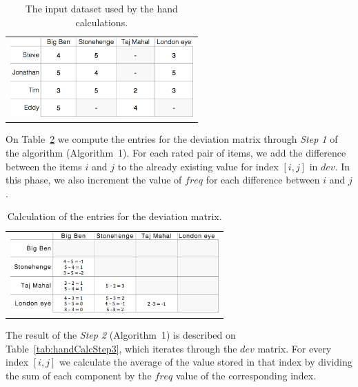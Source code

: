 \begin{center}
\begin{table}
	\centering
    \caption{The input dataset used by the hand calculations.}
    \label{tab:handCalcStep1}
    \begin{tabular}{c}
	\includegraphics[width=7cm]{./images/tables/table_slope_one_step_by_step_step_1.jpg}    
    \end{tabular}
    \end{table}
\end{center}
On Table~\ref{tab:handCalcStep2} we compute the entries for the deviation matrix through \emph{Step 1} of the algorithm (Algorithm~1). For each rated pair of items, we add the difference between the items $i$ and $j$ to the already existing value for index $[i,j]$ in $dev$. In this phase, we also increment the value of $freq$ for each difference between $i$ and $j$.\\
\begin{center}
\begin{table}
	\centering
    \caption{Calculation of the entries for the deviation matrix.}
    \label{tab:handCalcStep2}
    \begin{tabular}{c}
	\includegraphics[width=8cm]{./images/tables/table_slope_one_step_by_step_step_2.jpg}    
    \end{tabular}
    \end{table}
\end{center}
The result of the \emph{Step 2} (Algorithm~1) is described on Table~\ref{tab:handCalcStep3}, which iterates through the $dev$ matrix. For every index $[i,j]$ we calculate the average of the value stored in that index by dividing the sum of each component by the $freq$ value of the corresponding index.\\
